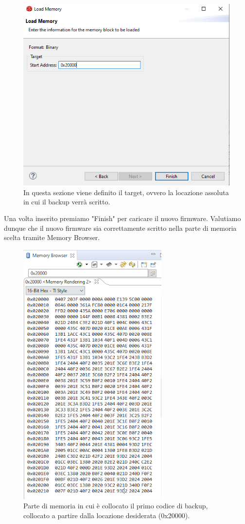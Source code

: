 \documentclass[LaM,binding=0.6cm,oneside]{../sapthesis}
\begin{document}
\begin{figure}[htbp]
\centerline{\includegraphics[scale=0.75]{examples/LoadMemory2.PNG}}
\caption{In questa sezione viene definito il target, ovvero la locazione assoluta in cui il backup verrà scritto.}
\label{fig}
\end{figure}
\newline


Una volta inserito premiamo "Finish" per caricare il nuovo firmware.
\clearpage
Valutiamo dunque che il nuovo firmware sia correttamente scritto nella parte di memoria scelta tramite Memory Browser.


\begin{figure}[htbp]
\centerline{\includegraphics[scale=0.75]{examples/LoadedMemory.png}}
\caption{Parte di memoria in cui è collocato il primo codice di backup, collocato a partire dalla locazione desiderata (0x20000).}
\label{fig}
\end{figure}
\newline
\end{document}

